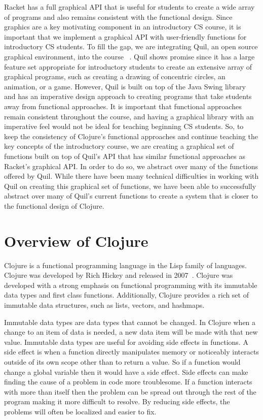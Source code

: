 \documentclass[12pt]{article}
\newcommand{\comment}[1]{{\bf \tt  {#1}}}
\newcommand{\emcomment}[1]{\textcolor{ForestGreen}{\comment{Elena: {#1}}}}
\newcommand{\todo}[1]{\textcolor{blue}{\comment{To Do: {#1}}}}
\begin{document}
Racket has a full graphical API that is useful for students to create a wide array of programs and also remains consistent with the functional design. Since graphics are a key motivating component in an introductory CS course, it is important that we implement a graphical API with user-friendly functions for introductory CS students. To fill the gap, we are integrating Quil, an open source graphical environment, into the course ~\cite{Quil}. Quil shows promise since it has a large feature set appropriate for introductory students to create an extensive array of graphical programs, such as creating a drawing of concentric circles, an animation, or a game. However, Quil is built on top of the Java Swing library and has an imperative design approach to creating programs that take students away from functional approaches. It is important that functional approaches remain consistent throughout the course, and having a graphical library with an imperative feel would not be ideal for teaching beginning CS students. So, to keep the consistency of Clojure's functional approaches and continue teaching the key concepts of the introductory course, we are creating a graphical set of functions built on top of Quil's API that has similar functional approaches as Racket's graphical API. In order to do so, we abstract over many of the functions offered by Quil. While there have been many technical difficulties in working with Quil on creating this graphical set of functions, we have been able to successfully abstract over many of Quil's current functions to create a system that is closer to the functional design of Clojure.


\section{Overview of Clojure}\label{sec:clojure}
Clojure is a functional programming language in the Lisp family of languages. Clojure was developed by Rich Hickey and released in 2007~\cite{Hickey:2008}. Clojure was developed with a strong emphasis on functional programming with its immutable data types and first class functions. Additionally, Clojure provides a rich set of immutable data structures, such as lists, vectors, and hashmaps.

Immutable data types are data types that cannot be changed. In Clojure when a change to an item of data is needed, a new data item will be made with that new value. Immutable data types are useful for avoiding side effects in functions. A side effect is when a function directly manipulates memory or noticeably interacts outside of its own scope other than to return a value. So if a function would change a global variable then it would have a side effect. Side effects can make finding the cause of a problem in code more troublesome. If a function interacts with more than itself then the problem can be spread out through the rest of the program making it more difficult to resolve. By reducing side effects, the problems will often be localized and easier to fix. 
\end{document}
